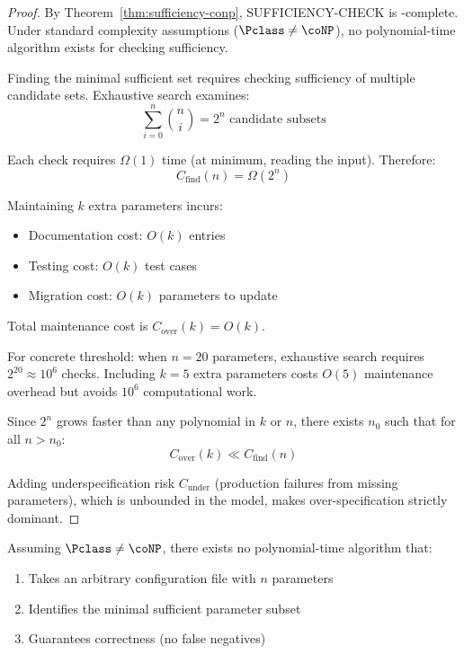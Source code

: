 \begin{proof}
By Theorem~\ref{thm:sufficiency-conp}, SUFFICIENCY-CHECK is \coNP-complete. Under standard complexity assumptions ($\Pclass \neq \coNP$), no polynomial-time algorithm exists for checking sufficiency.

Finding the minimal sufficient set requires checking sufficiency of multiple candidate sets. Exhaustive search examines:
\[
\sum_{i=0}^{n} \binom{n}{i} = 2^n \text{ candidate subsets}
\]

Each check requires $\Omega(1)$ time (at minimum, reading the input). Therefore:
\[
C_{\text{find}}(n) = \Omega(2^n)
\]

Maintaining $k$ extra parameters incurs:
\begin{itemize}
\item Documentation cost: $O(k)$ entries
\item Testing cost: $O(k)$ test cases
\item Migration cost: $O(k)$ parameters to update
\end{itemize}

Total maintenance cost is $C_{\text{over}}(k) = O(k)$.

For concrete threshold: when $n = 20$ parameters, exhaustive search requires $2^{20} \approx 10^6$ checks. Including $k = 5$ extra parameters costs $O(5)$ maintenance overhead but avoids $10^6$ computational work.

Since $2^n$ grows faster than any polynomial in $k$ or $n$, there exists $n_0$ such that for all $n > n_0$:
\[
C_{\text{over}}(k) \ll C_{\text{find}}(n)
\]

Adding underspecification risk $C_{\text{under}}$ (production failures from missing parameters), which is unbounded in the model, makes over-specification strictly dominant.
\end{proof}

\begin{corollary}
\label{cor:no-auto-minimize}
Assuming $\Pclass \neq \coNP$, there exists no polynomial-time algorithm that:
\begin{enumerate}
\item Takes an arbitrary configuration file with $n$ parameters
\item Identifies the minimal sufficient parameter subset
\item Guarantees correctness (no false negatives)
\end{enumerate}
\end{corollary}

